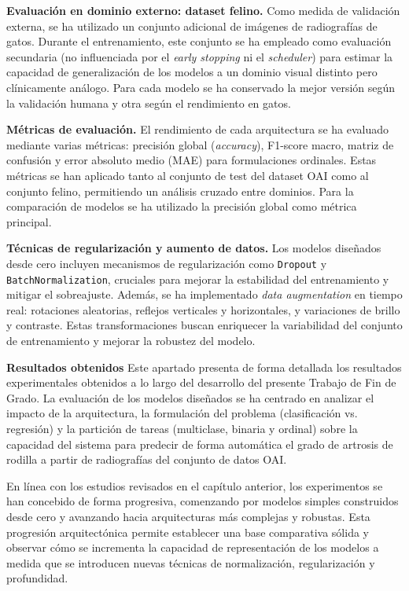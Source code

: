 \textbf{Evaluación en dominio externo: dataset felino.}
Como medida de validación externa, se ha utilizado un conjunto adicional de imágenes de radiografías de gatos. Durante el entrenamiento, este conjunto 
se ha empleado como evaluación secundaria (no influenciada por el \textit{early stopping} ni el \textit{scheduler}) para estimar la capacidad de generalización 
de los modelos a un dominio visual distinto pero clínicamente análogo. Para cada modelo se ha conservado la mejor versión según la validación humana 
y otra según el rendimiento en gatos.

\textbf{Métricas de evaluación.}
El rendimiento de cada arquitectura se ha evaluado mediante varias métricas: precisión global (\textit{accuracy}), F1-score macro, matriz de confusión 
y error absoluto medio (MAE) para formulaciones ordinales. Estas métricas se han aplicado tanto al conjunto de test del dataset OAI como al conjunto 
felino, permitiendo un análisis cruzado entre dominios. Para la comparación de modelos se ha utilizado la precisión global como métrica principal.

\textbf{Técnicas de regularización y aumento de datos.}
Los modelos diseñados desde cero incluyen mecanismos de regularización como \texttt{Dropout} y \texttt{BatchNormalization}, cruciales para mejorar la 
estabilidad del entrenamiento y mitigar el sobreajuste. Además, se ha implementado \textit{data augmentation} en tiempo real: rotaciones aleatorias, 
reflejos verticales y horizontales, y variaciones de brillo y contraste. Estas transformaciones buscan enriquecer la variabilidad del conjunto de entrenamiento 
y mejorar la robustez del modelo.

\textbf{Resultados obtenidos}
Este apartado presenta de forma detallada los resultados experimentales obtenidos a lo largo del desarrollo del presente Trabajo de Fin de Grado. La evaluación de los modelos diseñados se ha centrado en analizar el impacto de la arquitectura, la formulación del problema (clasificación vs. regresión) y la partición de tareas (multiclase, binaria y ordinal) sobre la capacidad del sistema para predecir de forma automática el grado de artrosis de rodilla a partir de radiografías del conjunto de datos OAI.

En línea con los estudios revisados en el capítulo anterior, los experimentos se han concebido de forma progresiva, comenzando por modelos simples construidos desde cero y avanzando hacia arquitecturas más complejas y robustas. Esta progresión arquitectónica permite establecer una base comparativa sólida y observar cómo se incrementa la capacidad de representación de los modelos a medida que se introducen nuevas técnicas de normalización, regularización y profundidad.

